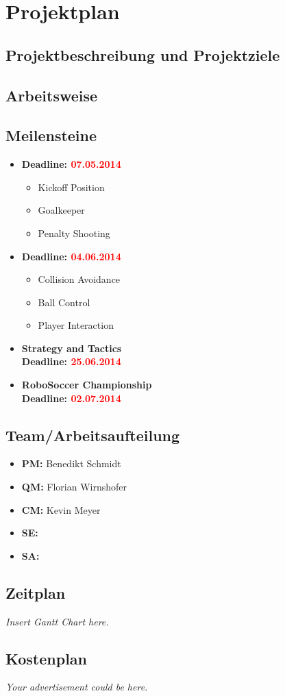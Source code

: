 \documentclass[12pt]{article}
\begin{document}
\section{Projektplan}
\subsection{Projektbeschreibung und Projektziele}

\subsection{Arbeitsweise}

\subsection{Meilensteine}

\begin{itemize}
	\item \textbf{Deadline: \textcolor{red}{07.05.2014}}
	\begin{itemize}
		\item Kickoff Position
		\item Goalkeeper
		\item Penalty Shooting
	\end{itemize}
	
	\item \textbf{Deadline: \textcolor{red}{04.06.2014}}
	\begin{itemize}
		\item Collision Avoidance
		\item Ball Control
		\item Player Interaction
	\end{itemize}
	
	\item \textbf{Strategy and Tactics}\\
	\textbf{Deadline: \textcolor{red}{25.06.2014}}
	
	\item \textbf{RoboSoccer Championship}\\
	\textbf{Deadline: \textcolor{red}{02.07.2014}}
\end{itemize}

\subsection{Team/Arbeitsaufteilung}

\begin{itemize}
	\item \textbf{PM:} Benedikt Schmidt
	\item \textbf{QM:} Florian Wirnshofer
	\item \textbf{CM:} Kevin Meyer
	\item \textbf{SE:} 
	\item \textbf{SA:} 
\end{itemize}

\subsection{Zeitplan}
\textit{Insert Gantt Chart here.}

\subsection{Kostenplan}
\textit{Your advertisement could be here.}
\end{document}
